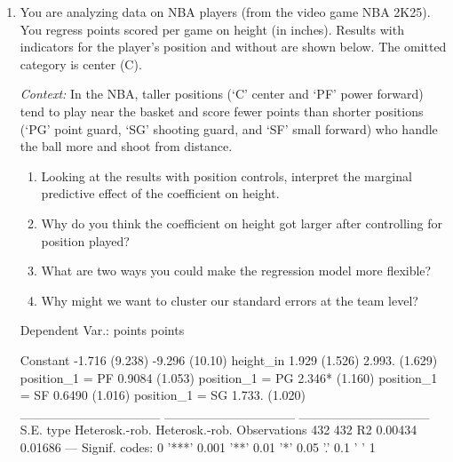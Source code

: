 \documentclass[12pt]{article}
\begin{document}
\begin{enumerate}
\begin{enumerate}
      \item A public health researcher wants to understand how much of the variation in life expectancy across counties can be explained by differences in median income.
    \end{enumerate}

    \newpage
  \item You are analyzing data on NBA players (from the video game NBA 2K25). You regress points scored per game on height (in inches).
    Results with indicators for the player's position and without are shown below.
    The omitted category is center (C).

    \emph{Context:} In the NBA, taller positions (`C' center and `PF' power forward) tend to play near the basket and score fewer points than shorter positions (`PG' point guard, `SG' shooting guard, and `SF' small forward) who handle the ball more and shoot from distance.

    \begin{enumerate}
      \item Looking at the results with position controls, interpret the marginal predictive effect of the coefficient on height.

      \item Why do you think the coefficient on height got larger after controlling for position played?

      \item What are two ways you could make the regression model more flexible?

      \item Why might we want to cluster our standard errors at the team level?
    \end{enumerate}

    \begin{codeblock}[{}]
Dependent Var.:         points           points

Constant        -1.716 (9.238)   -9.296 (10.10)
height_in        1.929 (1.526)   2.993. (1.629)
position_1 = PF                  0.9084 (1.053)
position_1 = PG                  2.346* (1.160)
position_1 = SF                  0.6490 (1.016)
position_1 = SG                  1.733. (1.020)
_______________ ______________   ______________
S.E. type       Heterosk.-rob.   Heterosk.-rob.
Observations               432              432
R2                     0.00434          0.01686
---
Signif. codes: 0 '***' 0.001 '**' 0.01 '*' 0.05 '.' 0.1 ' ' 1
    \end{codeblock}


\end{enumerate}
\end{document}

